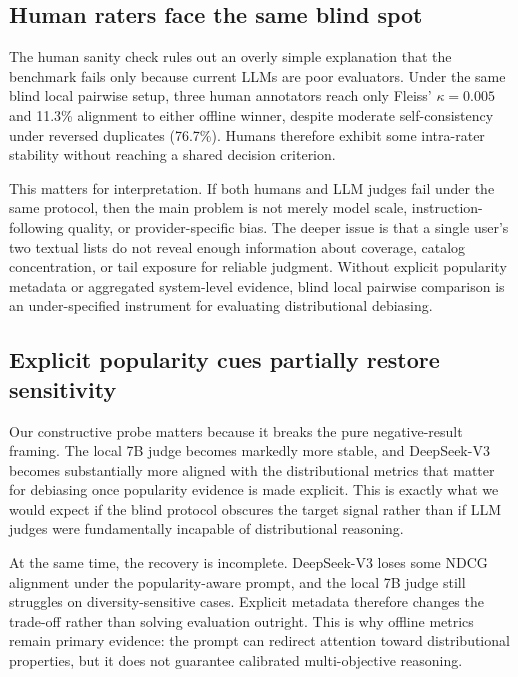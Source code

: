 \documentclass[pdflatex,sn-basic,referee,lineno]{sn-jnl}
\begin{document}
\subsection{Human raters face the same blind spot}

The human sanity check rules out an overly simple explanation that the benchmark fails only because current LLMs are poor evaluators. Under the same blind local pairwise setup, three human annotators reach only Fleiss' $\kappa = 0.005$ and 11.3\% alignment to either offline winner, despite moderate self-consistency under reversed duplicates (76.7\%). Humans therefore exhibit some intra-rater stability without reaching a shared decision criterion.

This matters for interpretation. If both humans and LLM judges fail under the same protocol, then the main problem is not merely model scale, instruction-following quality, or provider-specific bias. The deeper issue is that a single user's two textual lists do not reveal enough information about coverage, catalog concentration, or tail exposure for reliable judgment. Without explicit popularity metadata or aggregated system-level evidence, blind local pairwise comparison is an under-specified instrument for evaluating distributional debiasing.

\subsection{Explicit popularity cues partially restore sensitivity}

Our constructive probe matters because it breaks the pure negative-result framing. The local 7B judge becomes markedly more stable, and DeepSeek-V3 becomes substantially more aligned with the distributional metrics that matter for debiasing once popularity evidence is made explicit. This is exactly what we would expect if the blind protocol obscures the target signal rather than if LLM judges were fundamentally incapable of distributional reasoning.

At the same time, the recovery is incomplete. DeepSeek-V3 loses some NDCG alignment under the popularity-aware prompt, and the local 7B judge still struggles on diversity-sensitive cases. Explicit metadata therefore changes the trade-off rather than solving evaluation outright. This is why offline metrics remain primary evidence: the prompt can redirect attention toward distributional properties, but it does not guarantee calibrated multi-objective reasoning.
\end{document}
